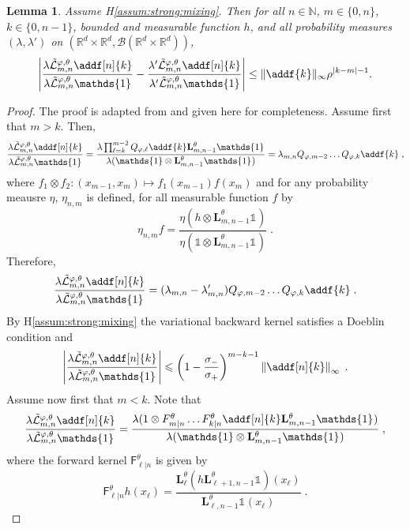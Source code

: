 \documentclass{article}
\newtheorem{lemma}[theorem]{Lemma}
\newcommand{\intvect}[2]{\{ #1, #2 \}}
\newcommand{\nset}{\mathbb{N}}
\newcommand{\1}{\mathbbm{1}}
\newcommand{\uk}[1]{\mathbf{L}_{#1}}
\def\1{\mathds{1}}
\newcommand{\eqsp}{\;}
\begin{document}
\begin{lemma} \label{lem:geo:bound}
Assume H\ref{assum:strong:mixing}. Then for all $n \in \nset$, $m \in \intvect{0}{n}$, $k \in \intvect{0}{n - 1}$, bounded and measurable function $h$, and all probability measures $(\lambda, \lambda')$ on $(\mathbb{R}^d\times\mathbb{R}^d,\mathcal{B}(\mathbb{R}^d\times \mathbb{R}^d))$, 
$$
\left|\frac{\lambda \tilde{\mathcal{L}}^{\varphi,\theta}_{m, n} \addf[n]{k}}{\lambda \tilde{\mathcal{L}}^{\varphi,\theta}_{m, n} \1_{}} - \frac{\lambda' \tilde{\mathcal{L}}^{\varphi,\theta}_{m, n} \addf[n]{k}}{\lambda'  \tilde{\mathcal{L}}^{\varphi,\theta}_{m, n} \1} \right| \leq \| \addf{k} \|_\infty \rho^{|k - m| - 1}. 
$$
\end{lemma}
\begin{proof}
The proof is adapted from  \cite[Lemma~D.3]{gloaguen2019pseudo} and given here for completeness. Assume first that $m>k$. Then,
$$
\frac{\lambda \tilde{\mathcal{L}}^{\varphi,\theta}_{m, n} \addf[n]{k}}{\lambda \tilde{\mathcal{L}}^{\varphi,\theta}_{m, n} \1_{}} = \frac{\lambda \prod_{\ell = k}^{m-2}Q_{\varphi,\ell}\addf{k}\uk{m, n-1}^\theta\1_{}}{\lambda(\1\otimes \uk{m, n-1}^\theta\1_{})} = \lambda_{m,n}Q_{\varphi,m-2}\ldots Q_{\varphi,k}\addf{k}\eqsp,
$$
where $f_1\otimes f_2: (x_{m-1},x_m) \mapsto f_1(x_{m-1})f(x_m)$ and for any probability meausre $\eta$, $\eta_{n,m}$ is defined, for all measurable function $f$ by
$$
\eta_{n,m}f = \frac{\eta (h\otimes \uk{m, n-1}^\theta\1_{})}{\eta (\1\otimes \uk{m, n-1}^\theta\1_{})}\eqsp.
$$
Therefore,
$$
\frac{\lambda \tilde{\mathcal{L}}^{\varphi,\theta}_{m, n} \addf[n]{k}}{\lambda \tilde{\mathcal{L}}^{\varphi,\theta}_{m, n} \1_{}} = (\lambda_{m,n}-\lambda'_{m,n})Q_{\varphi,m-2} \ldots Q_{\varphi,k}\addf{k}\eqsp.
$$
By H\ref{assum:strong:mixing} the variational backward kernel satisfies a Doeblin condition and 
$$
\left|\frac{\lambda \tilde{\mathcal{L}}^{\varphi,\theta}_{m, n} \addf[n]{k}}{\lambda \tilde{\mathcal{L}}^{\varphi,\theta}_{m, n} \1_{}}\right|\leqslant  \left(1-\frac{\sigma_-}{\sigma_+}\right)^{m-k-1}\left\|\addf[n]{k}\right\|_\infty\eqsp.
$$
Assume now first that $m< k$. Note that 
$$
\frac{\lambda\tilde{\mathcal{L}}^{\varphi,\theta}_{m, n} \addf[n]{k}}{\lambda\tilde{\mathcal{L}}^{\varphi,\theta}_{m, n} \1_{}}= \frac{\lambda(1\otimes F^\theta_{m|n}\ldots F^\theta_{k|n}\addf[n]{k}\uk{m, n-1}^\theta\1_{})}{\lambda (\1\otimes  \uk{m, n-1}^\theta\1_{})}\eqsp, 
$$
where the forward kernel $ \mathsf{F}^\theta_{\ell|n}$ is given by
$$
 \mathsf{F}^\theta_{\ell|n}h(x_\ell) = \frac{\uk{\ell}^\theta(h\uk{\ell+1, n-1}^\theta\1_{})(x_\ell)}{ \uk{\ell, n-1}^\theta\1_{}(x_\ell)}\eqsp.
$$
\end{proof}
\end{document}
